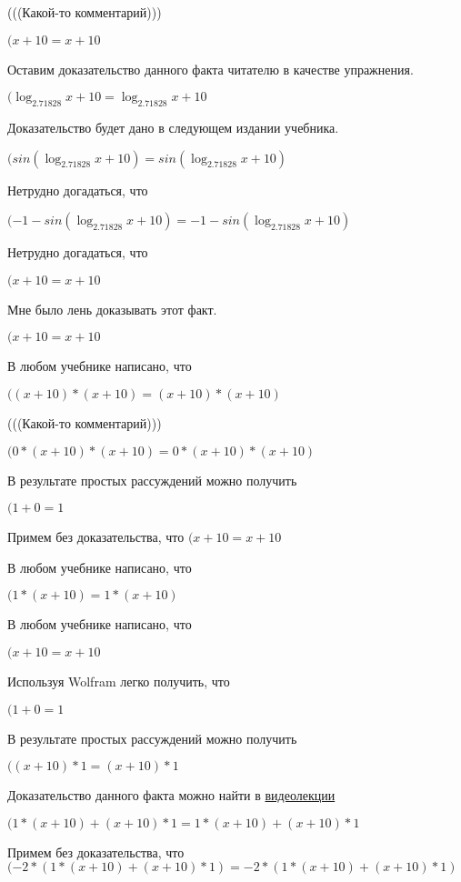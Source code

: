 \documentclass[12pt,a4paper,fleqn]{article}
\theoremstyle{definition}
\begin{document}
(((Какой-то комментарий)))

$( x  +  10  =  x  +  10 $

Оставим доказательство данного факта читателю в качестве упражнения.

$(\log_{ 2.71828 }{ x  +  10 } = \log_{ 2.71828 }{ x  +  10 }$

Доказательство будет дано в следующем издании учебника.

$(sin(\log_{ 2.71828 }{ x  +  10 }) = sin(\log_{ 2.71828 }{ x  +  10 })$

Нетрудно догадаться, что

$( -1  - sin(\log_{ 2.71828 }{ x  +  10 }) =  -1  - sin(\log_{ 2.71828 }{ x  +  10 })$

Нетрудно догадаться, что

$( x  +  10  =  x  +  10 $

Мне было лень доказывать этот факт.

$( x  +  10  =  x  +  10 $

В любом учебнике написано, что

$(( x  +  10 ) * ( x  +  10 ) = ( x  +  10 ) * ( x  +  10 )$

(((Какой-то комментарий)))

$( 0  * ( x  +  10 ) * ( x  +  10 ) =  0  * ( x  +  10 ) * ( x  +  10 )$

В результате простых рассуждений можно получить

$( 1  +  0  =  1 $

Примем без доказательства, что
$( x  +  10  =  x  +  10 $

В любом учебнике написано, что

$( 1  * ( x  +  10 ) =  1  * ( x  +  10 )$

В любом учебнике написано, что

$( x  +  10  =  x  +  10 $

Используя Wolfram легко получить, что

$( 1  +  0  =  1 $

В результате простых рассуждений можно получить

$(( x  +  10 ) *  1  = ( x  +  10 ) *  1 $

Доказательство данного факта можно найти в \href{https://www.youtube.com/watch?v=dQw4w9WgXcQ}{видеолекции}

$( 1  * ( x  +  10 ) + ( x  +  10 ) *  1  =  1  * ( x  +  10 ) + ( x  +  10 ) *  1 $

Примем без доказательства, что
$( -2  * ( 1  * ( x  +  10 ) + ( x  +  10 ) *  1 ) =  -2  * ( 1  * ( x  +  10 ) + ( x  +  10 ) *  1 )$
\end{document}
